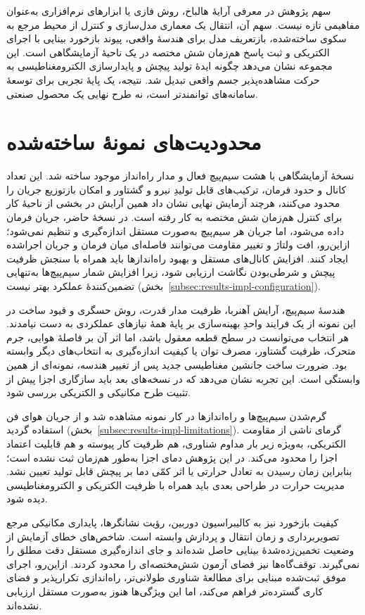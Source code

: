 سهم پژوهش در معرفی آرایهٔ هالباخ، روش فازی یا ابزارهای نرم‌افزاری به‌عنوان مفاهیمی تازه نیست. سهم آن، انتقال یک معماری مدل‌سازی و کنترل از محیط مرجع به سکوی ساخته‌شده، بازتعریف مدل برای هندسهٔ واقعی، پیوند بازخورد بینایی با اجرای الکتریکی و ثبت پاسخ هم‌زمان شش مختصه در یک ناحیهٔ آزمایشگاهی است. این مجموعه نشان می‌دهد چگونه ایدهٔ تولید پیچش و پایدارسازی الکترومغناطیسی به حرکت مشاهده‌پذیر جسم واقعی تبدیل شد. نتیجه، یک پایهٔ تجربی برای توسعهٔ سامانه‌های توانمندتر است، نه طرح نهایی یک محصول صنعتی.

\section{محدودیت‌های نمونهٔ ساخته‌شده}

نسخهٔ آزمایشگاهی با هشت سیم‌پیچ فعال و مدار راه‌انداز موجود ساخته شد. این تعداد کانال و حدود فرمان، ترکیب‌های قابل تولیدِ نیرو و گشتاور و امکان بازتوزیع جریان را محدود می‌کنند، هرچند آزمایش نهایی نشان داد همین آرایش در بخشی از ناحیهٔ کار برای کنترل هم‌زمان شش مختصه به کار رفته است. در نسخهٔ حاضر، جریان فرمان داده می‌شود، اما جریان هر سیم‌پیچ به‌صورت مستقل اندازه‌گیری و تنظیم نمی‌شود؛ ازاین‌رو، افت ولتاژ و تغییر مقاومت می‌توانند فاصله‌ای میان فرمان و جریان اجراشده ایجاد کنند. افزایش کانال‌های مستقل و بهبود راه‌اندازها باید همراه با سنجش ظرفیت پیچش و شرطی‌بودن نگاشت ارزیابی شود، زیرا افزایش شمار سیم‌پیچ‌ها به‌تنهایی تضمین‌کنندهٔ عملکرد بهتر نیست (بخش~\ref{subsec:results-impl-configuration}).

هندسهٔ سیم‌پیچ، آرایش آهنربا، ظرفیت مدار قدرت، روش حسگری و قیود ساخت در این نمونه از یک فرایند واحدِ بهینه‌سازی بر پایهٔ همهٔ نیازهای عملکردی به دست نیامدند. هر انتخاب می‌توانست در سطح قطعه معقول باشد، اما اثر آن بر فاصلهٔ هوایی، جرم متحرک، ظرفیت گشتاور، مصرف توان یا کیفیت اندازه‌گیری به انتخاب‌های دیگر وابسته بود. ضرورت ساخت جانشین مغناطیسی جدید پس از تغییر هندسه، نمونه‌ای از همین وابستگی است. این تجربه نشان می‌دهد که در نسخه‌های بعد باید سازگاری اجزا پیش از تثبیت طرح مکانیکی و الکتریکی بررسی شود.

گرم‌شدن سیم‌پیچ‌ها و راه‌اندازها در کار نمونه مشاهده شد و از جریان هوای فن استفاده گردید (بخش~\ref{subsec:results-impl-limitations}). گرمای ناشی از مقاومت الکتریکی، به‌ویژه زیر بار مداوم شناوری، هم ظرفیت کار پیوسته و هم قابلیت اعتماد اجزا را محدود می‌کند. در این پژوهش دمای اجزا به‌طور هم‌زمان ثبت نشده است؛ بنابراین زمان رسیدن به تعادل حرارتی یا اثر کمّی دما بر پیچش قابل تولید تعیین نشد. مدیریت حرارت در طراحی بعدی باید همراه با ظرفیت الکتریکی و الکترومغناطیسی دیده شود.

کیفیت بازخورد نیز به کالیبراسیون دوربین، رؤیت نشانگرها، پایداری مکانیکی مرجع تصویربرداری و زمان انتقال و پردازش وابسته است. شاخص‌های خطای آزمایش از وضعیت تخمین‌زده‌شدهٔ بینایی حاصل شده‌اند و جای اندازه‌گیری مستقل دقت مطلق را نمی‌گیرند. توقف‌گاه‌ها نیز فضای آزمون شش‌مختصه‌ای را محدود کردند. ازاین‌رو، اجرای موفق ثبت‌شده مبنایی برای مطالعهٔ شناوری طولانی‌تر، راه‌اندازی تکرارپذیر و فضای کاری گسترده‌تر فراهم می‌کند، اما این ویژگی‌ها هنوز به‌صورت مستقل ارزیابی نشده‌اند.

